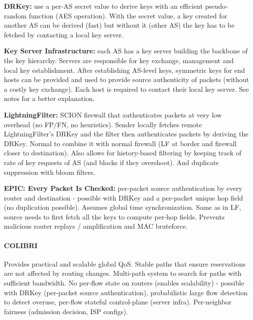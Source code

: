 \textbf{DRKey:} use a per-AS secret value to derive keys with an efficient pseudo-random function (AES operation). With the secret value, a key created for another AS can be derived (fast) but without it (other AS) the key has to be fetched by contacting a local key server.

\textbf{Key Server Infrastructure:} each AS has a key server building the backbone of the key hierarchy. Servers are responsible for key exchange, management and local key establishment. After establishing AS-level keys, symmetric keys for end hosts can be provided and used to provide source authenticity of packets (without a costly key exchange). Each host is required to contact their local key server. See notes for a better explanation. %

\textbf{LightningFilter:} SCION firewall that authenticates packets at very low overhead (no FP/FN, no heuristics). Sender locally fetches remote LightningFilter's DRKey and the filter then authenticates packets by deriving the DRKey. Normal to combine it with normal firewall (LF at border and firewall closer to destination). Also allows for history-based filtering by keeping track of rate of key requests of AS (and blocks if they overshoot). And duplicate suppression with bloom filters.

\textbf{EPIC: Every Packet Is Checked:} per-packet source authentication by every router and destination - possible with DRKey and a per-packet unique hop field (no duplication possible). Assumes global time synchronization. Same as in LF, source needs to first fetch all the keys to compute per-hop fields. Prevents malicious router replays / amplification and MAC bruteforce. %


\paragraph{COLIBRI}
Provides practical and scalable global QoS. Stable paths that ensure reservations are not affected by routing changes. Multi-path system to search for paths with sufficient bandwidth. No per-flow state on routers (enables scalability) - possible with DRKey (per-packet source authentication), probabilistic large flow detection to detect overuse, per-flow stateful control-plane (server infra). Per-neighbor fairness (admission decision, ISP configs). %

